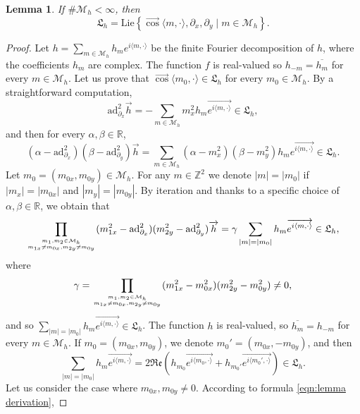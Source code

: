 \documentclass[10pt]{article}
\newcommand{\p}{\partial}
\newcommand{\R}{{\mathbb R}}
\newcommand{\Z}{{\mathbb Z}}
\newcommand{\M}{{\mathcal M}}
\newcommand{\ov}{\overline}
\newcommand{\la}{\langle}
\newcommand{\ra}{\rangle}
\newcommand{\ad}{\text{ad}}
\newcommand{\f}{\overrightarrow}
\newtheorem{lemma}{Lemma}
\begin{document}
\begin{lemma} \label{lemma canceled modes dim2} If $\# \M_h < \infty$, then 
\begin{equation*}
        \mathfrak{L}_h=\mathrm{Lie} \left\{ \f{\cos}\la m,  \cdot \ra,\p_x,\p_y \mid m \in \M_h\right\}.
\end{equation*}
\end{lemma}

\begin{proof} Let $h=\sum_{m\in \M_h}h_me^{i \la m, \cdot \ra}$ be the finite Fourier decomposition of $h$, where the coefficients $h_m$ are complex. The function $f$ is real-valued so $h_{-m}=\ov{h_m}$ for every $m\in \M_h$. Let us prove that $\f{\cos}\la m_0, \cdot \ra \in \mathfrak{L}_h$ for every $m_0 \in \M_h$. By a straightforward computation, 
\begin{equation*}
    \ad^2_{\p_x}\f{h}=-\sum_{m \in \M_h}m_x^2h_m\f{e^{i \la m, \cdot\ra}} \in \mathfrak{L}_h,
    \end{equation*}
and then for every $\alpha,\beta \in \R$,
\begin{equation*}
    (\alpha - \ad_{\p_x}^2)(\beta - \ad_{\p_y}^2)\f{h}=\sum_{m\in \M_h}(\alpha-m_x^2)(\beta - m_y^2)h_me\f{^{i \la m, \cdot\ra}} \in \mathfrak{L}_h.
\end{equation*}
Let $m_0=(m_{0x},m_{0y})\in \M_h$. For any $m\in \Z^2$ we denote $|m|=|m_0|$ if $|m_x|=|m_{0x}|$ and $|m_y|=|m_{0y}|$. By iteration and thanks to a specific choice of $\alpha,\beta\in \R$, we obtain that
\begin{equation*}
    \prod_{m_1,m_2\in \M_h \atop m_{1x}\neq m_{0x}, m_{2y}\neq m_{0y}}(m_{1x}^2-\ad_{\p_x}^2)(m_{2y}^2-\ad_{\p_y}^2)\f{h}=\gamma \sum_{|m|=|m_0|}h_m\f{e^{i \la m , \cdot\ra }} \in \mathfrak{L}_h,
\end{equation*}
where 
\begin{equation*}
    \gamma = \prod_{m_1,m_2\in \M_h \atop m_{1x}\neq m_{0x}, m_{2y}\neq m_{0y}}(m_{1x}^2-m_{0x}^2)(m_{2y}^2-m_{0y}^2)\neq 0,
\end{equation*}
and so $\sum_{|m|=|m_0|}h_m\f{e^{i \la m , \cdot\ra }} \in \mathfrak{L}_h$. The function $h$ is real-valued, so $\ov{h_m} =h_{-m}$ for every $m\in \M_h$. If $m_0=(m_{0x},m_{0y})$, we denote $m_0'=(m_{0x},-m_{0y})$, and then
\begin{equation*}
    \sum_{|m|=|m_0|}h_m\f{e^{i \la m , \cdot\ra }}=2\mathfrak{Re}(h_{m_0}\f{e^{i\la m_0, \cdot \ra}} + h_{m_0'}\f{e^{i\la m_0', \cdot \ra}}) \in \mathfrak{L}_h. 
\end{equation*}
Let us consider the case where $m_{0x},m_{0y}\neq 0$. According to formula \eqref{eqn:lemma derivation},

\end{proof}
\end{document}
